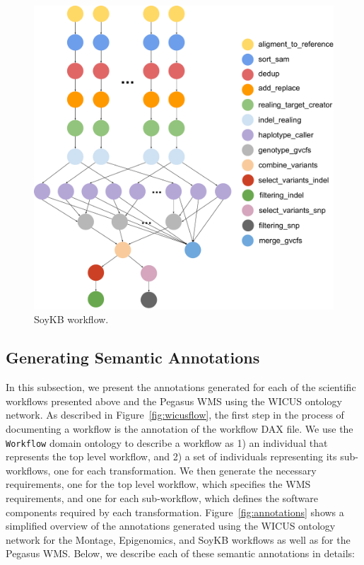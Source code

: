 \begin{figure}[!htb]
	\centering
	\includegraphics[width=0.95\linewidth]{figures/workflow-soybean}
	\caption{SoyKB workflow.}
	\label{fig:workflow-soykb}
\end{figure}



\subsection{Generating Semantic Annotations}

In this subsection, we present the annotations generated for each of the scientific 
workflows presented above and the Pegasus WMS using the WICUS ontology
network. As described in Figure~\ref{fig:wicusflow}, the first step in the process of 
documenting a workflow is the annotation of the workflow DAX file. We use the 
\texttt{Workflow} domain ontology to describe a workflow as 1) an individual that 
represents the top level workflow, and 2) a set of individuals representing its 
sub-workflows, one for each transformation. We then generate the necessary 
requirements, one for the top level workflow, which specifies the WMS requirements, 
and one for each sub-workflow, which defines the software components required 
by each transformation. 
Figure~\ref{fig:annotations} shows a simplified overview of the annotations generated 
using the WICUS ontology network for the Montage, Epigenomics, and SoyKB 
workflows as well as for the Pegasus WMS. Below, we describe each of these
semantic annotations in details:

